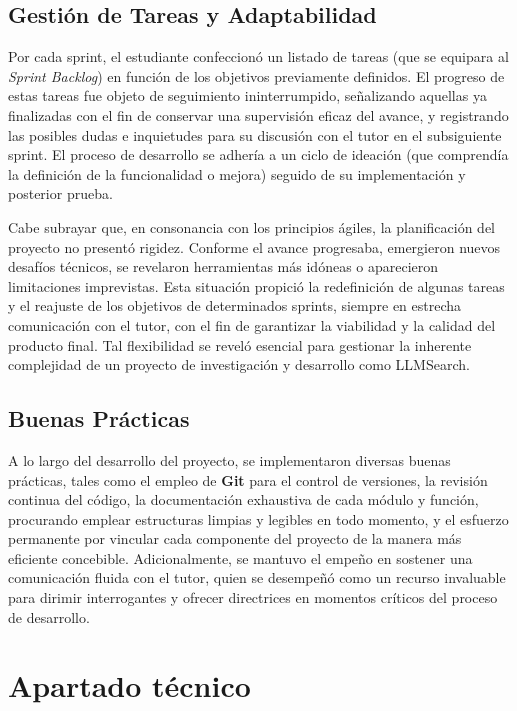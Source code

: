 \subsection{Gestión de Tareas y Adaptabilidad}
\label{subsec:gestion_tareas}

Por cada sprint, el estudiante confeccionó un listado de tareas (que se equipara al \textit{Sprint Backlog}) en función de los objetivos previamente definidos. El progreso de estas tareas fue objeto de seguimiento ininterrumpido, señalizando aquellas ya finalizadas con el fin de conservar una supervisión eficaz del avance, y registrando las posibles dudas e inquietudes para su discusión con el tutor en el subsiguiente sprint. El proceso de desarrollo se adhería a un ciclo de ideación (que comprendía la definición de la funcionalidad o mejora) seguido de su implementación y posterior prueba.

Cabe subrayar que, en consonancia con los principios ágiles, la planificación del proyecto no presentó rigidez. Conforme el avance progresaba, emergieron nuevos desafíos técnicos, se revelaron herramientas más idóneas o aparecieron limitaciones imprevistas. Esta situación propició la redefinición de algunas tareas y el reajuste de los objetivos de determinados sprints, siempre en estrecha comunicación con el tutor, con el fin de garantizar la viabilidad y la calidad del producto final. Tal flexibilidad se reveló esencial para gestionar la inherente complejidad de un proyecto de investigación y desarrollo como LLMSearch.

\subsection{Buenas Prácticas}
\label{subsec:buenas_practicas}
A lo largo del desarrollo del proyecto, se implementaron diversas buenas prácticas, tales como el empleo de \textbf{Git} para el control de versiones, la revisión continua del código, la documentación exhaustiva de cada módulo y función, procurando emplear estructuras limpias y legibles en todo momento, y el esfuerzo permanente por vincular cada componente del proyecto de la manera más eficiente concebible. Adicionalmente, se mantuvo el empeño en sostener una comunicación fluida con el tutor, quien se desempeñó como un recurso invaluable para dirimir interrogantes y ofrecer directrices en momentos críticos del proceso de desarrollo.


\section{Apartado técnico}
\label{sec:apartado_tecnico}

